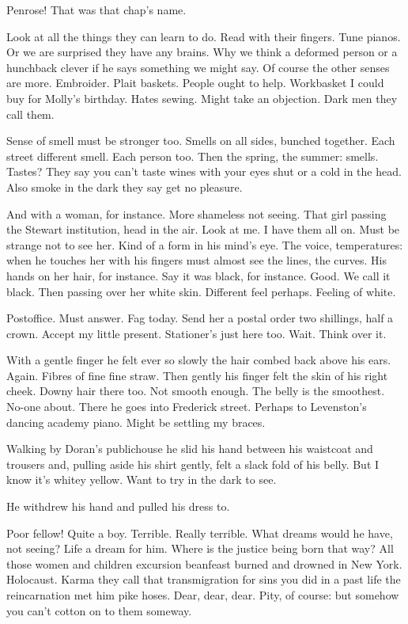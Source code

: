 Penrose! That was that chap's name.

Look at all the things they can learn to do. Read with their fingers.
Tune pianos. Or we are surprised they have any brains. Why we think a
deformed person or a hunchback clever if he says something we might say.
Of course the other senses are more. Embroider. Plait baskets. People
ought to help. Workbasket I could buy for Molly's birthday. Hates sewing.
Might take an objection. Dark men they call them.

Sense of smell must be stronger too. Smells on all sides, bunched
together. Each street different smell. Each person too. Then the spring,
the summer: smells. Tastes? They say you can't taste wines with your eyes
shut or a cold in the head. Also smoke in the dark they say get no
pleasure.

And with a woman, for instance. More shameless not seeing. That girl
passing the Stewart institution, head in the air. Look at me. I have them
all on. Must be strange not to see her. Kind of a form in his mind's eye.
The voice, temperatures: when he touches her with his fingers must almost
see the lines, the curves. His hands on her hair, for instance. Say it
was black, for instance. Good. We call it black. Then passing over her
white skin. Different feel perhaps. Feeling of white.

Postoffice. Must answer. Fag today. Send her a postal order two
shillings, half a crown. Accept my little present. Stationer's just here
too. Wait. Think over it.

With a gentle finger he felt ever so slowly the hair combed back above
his ears. Again. Fibres of fine fine straw. Then gently his finger felt
the skin of his right cheek. Downy hair there too. Not smooth enough. The
belly is the smoothest. No-one about. There he goes into Frederick
street. Perhaps to Levenston's dancing academy piano. Might be settling
my braces.

Walking by Doran's publichouse he slid his hand between his waistcoat and
trousers and, pulling aside his shirt gently, felt a slack fold of his
belly. But I know it's whitey yellow. Want to try in the dark to see.

He withdrew his hand and pulled his dress to.

Poor fellow! Quite a boy. Terrible. Really terrible. What dreams would he
have, not seeing? Life a dream for him. Where is the justice being born
that way? All those women and children excursion beanfeast burned and
drowned in New York. Holocaust. Karma they call that transmigration for
sins you did in a past life the reincarnation met him pike hoses. Dear,
dear, dear. Pity, of course: but somehow you can't cotton on to them
someway.

